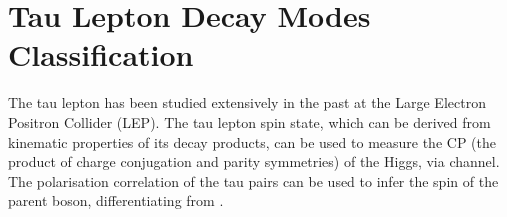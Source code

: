 \chapter{Tau Lepton Decay Modes Classification}
\label{chap:Tau}

%
{}%

The tau lepton has been studied extensively in the past at the Large Electron Positron Collider (LEP)\cite{Schael:2005am}. The tau lepton spin state, which can be derived from kinematic properties of its decay products, can be used to measure the CP (the product of charge conjugation and parity symmetries) of the Higgs, via \HiggsToTauTau channel\cite{Berge:2015nua}.  The polarisation correlation of the tau pairs can be used to infer the spin of the parent boson, differentiating \HiggsToTauTau from \ZToTauTau.

